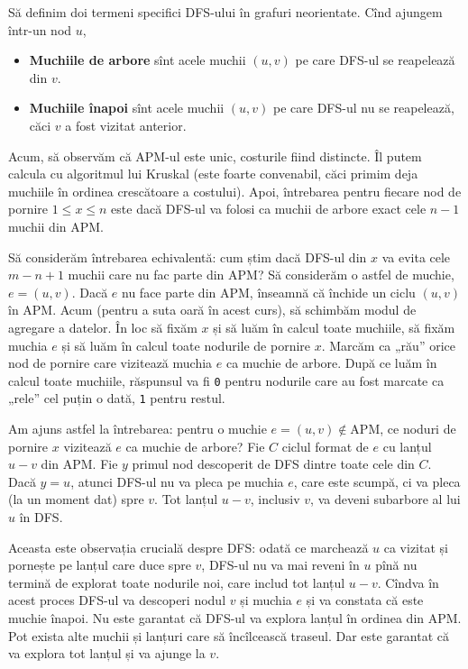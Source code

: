 \documentclass[../main.tex]{subfiles}
\begin{document}
Să definim doi termeni specifici DFS-ului în grafuri neorientate. Cînd ajungem într-un nod $u$,

\begin{itemize}
  \item \textbf{Muchiile de arbore} sînt acele muchii $(u,v)$ pe care DFS-ul se reapelează din $v$.

  \item \textbf{Muchiile înapoi} sînt acele muchii $(u,v)$ pe care DFS-ul nu se reapelează, căci $v$ a fost vizitat anterior.
\end{itemize}

Acum, să observăm că APM-ul este unic, costurile fiind distincte. Îl putem calcula cu algoritmul lui Kruskal (este foarte convenabil, căci primim deja muchiile în ordinea crescătoare a costului). Apoi, întrebarea pentru fiecare nod de pornire $1 \leq x \leq n$ este dacă DFS-ul va folosi ca muchii de arbore exact cele $n-1$ muchii din APM.

Să considerăm întrebarea echivalentă: cum știm dacă DFS-ul din $x$ va evita cele $m-n+1$ muchii care nu fac parte din APM? Să considerăm o astfel de muchie, $e=(u,v)$. Dacă $e$ nu face parte din APM, înseamnă că închide un ciclu $(u,v)$ în APM. Acum (pentru a suta oară în acest curs), să schimbăm modul de agregare a datelor. În loc să fixăm $x$ și să luăm în calcul toate muchiile, să fixăm muchia $e$ și să luăm în calcul toate nodurile de pornire $x$. Marcăm ca „rău” orice nod de pornire care vizitează muchia $e$ ca muchie de arbore. După ce luăm în calcul toate muchiile, răspunsul va fi \texttt{0} pentru nodurile care au fost marcate ca „rele” cel puțin o dată, \texttt{1} pentru restul.

Am ajuns astfel la întrebarea: pentru o muchie $e=(u,v) \not\in \textrm{APM}$, ce noduri de pornire $x$ vizitează $e$ ca muchie de arbore? Fie $C$ ciclul format de $e$ cu lanțul $u-v$ din APM. Fie $y$ primul nod descoperit de DFS dintre toate cele din $C$. Dacă $y = u$, atunci DFS-ul nu va pleca pe muchia $e$, care este scumpă, ci va pleca (la un moment dat) spre $v$. Tot lanțul $u-v$, inclusiv $v$, va deveni subarbore al lui $u$ în DFS.

Aceasta este observația crucială despre DFS: odată ce marchează $u$ ca vizitat și pornește pe lanțul care duce spre $v$, DFS-ul nu va mai reveni în $u$ pînă nu termină de explorat toate nodurile noi, care includ tot lanțul $u-v$. Cîndva în acest proces DFS-ul va descoperi nodul $v$ și muchia $e$ și va constata că este muchie înapoi. Nu este garantat că DFS-ul va explora lanțul în ordinea din APM. Pot exista alte muchii și lanțuri care să încîlcească traseul. Dar este garantat că va explora tot lanțul și va ajunge la $v$.
\end{document}
